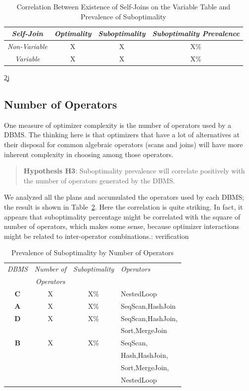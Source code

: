 {\begin{table}
\begin{center}
\begin{tabular}{c|c|c|c}
{\em Self-Join} & {\em Optimality} & {\em Suboptimality} & {\em Suboptimality Prevalence}\\
\hline
{\em Non-Variable} & X & X & X\% \\
{\em Variable} & X & X & X\%
	
\end{tabular}
\end{center}
\caption{Correlation Between Existence of Self-Joins on the Variable Table and Prevalence of Suboptimality\label{tab:corSelfVar}}
\end{table}
}

\c2j{}{
\subsection{Number of Operators}
One measure of optimizer complexity is the number of operators used by a
DBMS. The thinking here is that optimizers that have a lot of alternatives
at their disposal for common algebraic operators (scans and joins) will have
more inherent complexity in choosing among those operators.

\begin{quote}
{\bf Hypothesis H3}: Suboptimality prevalence will correlate positively
with the number of operators generated by the DBMS.
\end{quote}

We analyzed all the plans and accumulated the operators used by each DBMS;
the result is shown in Table~\ref{tab:ops}. Here the correlation is quite
striking. In fact, it appears that suboptimality percentage might be 
correlated with the square of number of operators, which makes some sense,
because optimizer interactions might be related to inter-operator
combinations.{\todo: verification}

\begin{table}
\begin{center}
\begin{tabular}{c|c|c|l}
{\em DBMS} & {\em Number of} &{\em Suboptimality} & {\em Operators}\\
& {\em Operators} && \\
\hline
{\bf C} & X & X\% &NestedLoop\\
{\bf A} & X & X\% &SeqScan,HashJoin\\
{\bf D} & X & X\% &SeqScan,HashJoin,\\
&&&Sort,MergeJoin\\
{\bf B} & X & X\% & SeqScan,\\
&&&Hash,HashJoin,\\
&&&Sort,MergeJoin,\\
&&&NestedLoop\\
\end{tabular}
\end{center}
\caption{Prevalence of Suboptimality by Number of Operators\label{tab:ops}}
\end{table}
}


